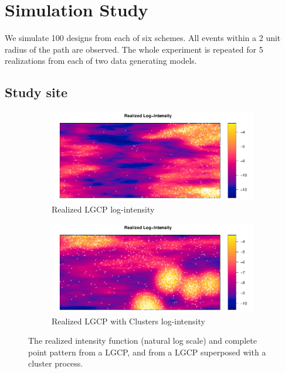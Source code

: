 \documentclass[review]{elsarticle}
\begin{document}
\section{Simulation Study}

We simulate 100 designs from each of six schemes. All events within a 2 unit
radius of the path are observed. The whole experiment is repeated for 5
realizations from each of two data generating models.


\subsection{Study site}

\begin{figure}

\begin{subfigure}{5in}
\includegraphics[width=5in]{../graphics/lambda-LGCP000004.pdf}
\caption{Realized LGCP log-intensity}
\label{lambdalgcp}
\end{subfigure}

\begin{subfigure}{5in}
\includegraphics[width=5in]{../graphics/lambda-Cluster000004.pdf}
\caption{Realized LGCP with Clusters log-intensity}
\label{lambdacluster}
\end{subfigure}

\caption{The realized intensity function (natural log scale) and complete
point pattern from a LGCP, and from a LGCP superposed with a cluster process.}
\label{fulldata}
\end{figure}
\end{document}
